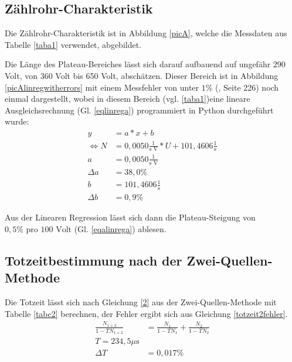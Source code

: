 \subsection{Zählrohr-Charakteristik}
Die Zählrohr-Charakteristik ist in Abbildung \ref{picA}, welche 
die Messdaten aus Tabelle \ref{taba1} verwendet, abgebildet. 
 
\FloatBarrier
Die Länge des Plateau-Bereiches lässt sich darauf aufbauend auf ungefähr
290 Volt, von 360 Volt bis 650 Volt, abschätzen. Dieser Bereich ist in 
Abbildung \ref{picAlinregwitherrors} mit einem Messfehler von unter $1\%$ (\cite{anleitung}, Seite 226) 
noch einmal dargestellt, wobei in diesem Bereich (vgl. \ref{taba1})eine lineare 
Ausgleichsrechnung \cite{linreg} (Gl. \ref{eqlinrega}) programmiert in Python durchgeführt wurde:
\begin{align}
y&=a*x+b \\
\Leftrightarrow N&=0,0050\frac{1}{\text{s V}}*U+101,4606\frac{1}{\text{s}} \label{eqlinrega} \\
a&=0,0050\frac{1}{\text{s V}} \label{eqalinrega}\\
\Delta a&=38,0\% \\
b&=101,4606\frac{1}{\text{s}}\\
\Delta b&=0,9\%
\end{align}

\FloatBarrier
Aus der Linearen Regression lässt sich dann die Plateau-Steigung von $0,5\% \text{ pro } 
100 \text{ Volt }$(Gl. \ref{eqalinrega}) ablesen.
\subsection{Totzeitbestimmung nach der Zwei-Quellen-Methode}
\FloatBarrier

Die Totzeit lässt sich nach Gleichung \ref{2} aus der Zwei-Quellen-Methode mit Tabelle \ref{tabc2} berechnen,
der Fehler ergibt sich aus Gleichung \ref{totzeit2fehler}.
\begin{align}
\frac{N_{1+2}}{1 - T N_{1+2}}&=\frac{N_1}{1 - T N_1} + \frac{N_2}{1 - T N_2} \label{totzeit2fehler}\\
T= 234,5 \mu\text{s} \label{eqtot2}\\
\Delta T&=0,017\%
\end{align}
